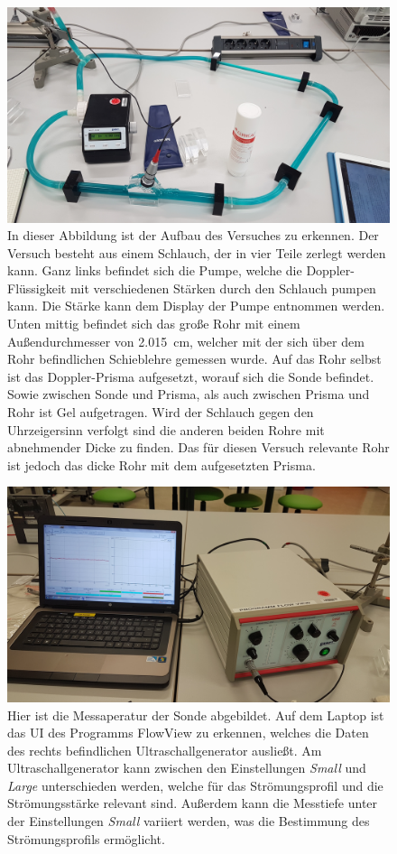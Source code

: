 \begin{figure}[H]
    \centering
    \includegraphics[width=0.75\linewidth]{images/Schlauch.jpg}
    \caption{In dieser Abbildung ist der Aufbau des Versuches zu erkennen. Der Versuch besteht aus einem Schlauch, der in vier Teile zerlegt werden kann. Ganz links befindet sich die 
    Pumpe, welche die Doppler-Flüssigkeit mit verschiedenen Stärken durch den Schlauch pumpen kann. Die Stärke kann dem Display der Pumpe entnommen werden. Unten mittig befindet sich
    das große Rohr mit einem Außendurchmesser von \SI{2.015}{\centi\meter}, welcher mit der sich über dem Rohr befindlichen Schieblehre gemessen wurde. Auf das Rohr selbst ist das 
    Doppler-Prisma aufgesetzt, worauf sich die Sonde befindet. Sowie zwischen Sonde und Prisma, als auch zwischen Prisma und Rohr ist Gel aufgetragen. Wird der Schlauch gegen den 
    Uhrzeigersinn verfolgt sind die anderen beiden Rohre mit abnehmender Dicke zu finden. Das für diesen Versuch relevante Rohr ist jedoch das dicke Rohr mit dem aufgesetzten Prisma.}
    \label{fig:3}
\end{figure}
\begin{figure}[H]
    \centering
    \includegraphics[width=0.75\linewidth]{images/Messaperatur.jpg}
    \caption{Hier ist die Messaperatur der Sonde abgebildet. Auf dem Laptop ist das UI des Programms FlowView zu erkennen, welches die Daten des rechts befindlichen Ultraschallgenerator 
    ausließt. Am Ultraschallgenerator kann zwischen den Einstellungen \textit{Small} und \textit{Large} unterschieden werden, welche für das Strömungsprofil und die Strömungsstärke relevant sind.
    Außerdem kann die Messtiefe unter der Einstellungen \textit{Small} variiert werden, was die Bestimmung des Strömungsprofils ermöglicht.}
    \label{fig:4}
\end{figure}

